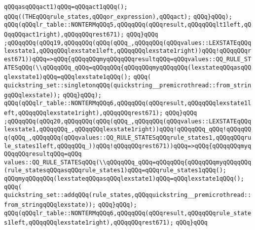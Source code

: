 \verb|qQQqasqQQqact1)qQQq=qQQqact1qQQq();|\newline
\verb|qQQq((THEqQQqrule_states,qQQqor_expression),qQQqact);|\newline
\verb|qQQq}qQQq);|\newline
\verb|qQQq(qQQqlr_table::NONTERMqQQq5,qQQqqQQq(qQQqresult,qQQqqQQqlt1left,qQQqqQQqact1right),qQQqqQQqrest671);|\newline
\verb|qQQq}qQQq|\newline
\verb|;qQQqqQQq(qQQq19,qQQqqQQq(qQQq(qQQq_,qQQqqQQq(qQQqvalues::LEXSTATEqQQqlexstate1,qQQqqQQqlexstate1left,qQQqqQQqlexstate1right))qQQq!qQQqqQQqrest671))qQQq=>qQQq{qQQqqQQqmyqQQqqQQqresultqQQq=qQQqvalues::QQ_RULE_STATESqQQq(\\qQQqqQQq_qQQq=qQQqqQQq{qQQqqQQqmyqQQqqQQq(lexstateqQQqasqQQqlexstate1)qQQq=qQQqlexstate1qQQq();|\newline
\verb|qQQq(|\newline
\verb|quickstring_set::singletonqQQq(quickstring__premicrothread::from_stringqQQqlexstate));|\newline
\verb|qQQq}qQQq);|\newline
\verb|qQQq(qQQqlr_table::NONTERMqQQq6,qQQqqQQq(qQQqresult,qQQqqQQqlexstate1left,qQQqqQQqlexstate1right),qQQqqQQqrest671);|\newline
\verb|qQQq}qQQq|\newline
\verb|;qQQqqQQq(qQQq20,qQQqqQQq(qQQq(qQQq_,qQQqqQQq(qQQqvalues::LEXSTATEqQQqlexstate1,qQQqqQQq_,qQQqqQQqlexstate1right))qQQq!qQQqqQQq_qQQq!qQQqqQQq(qQQq_,qQQqqQQq(qQQqvalues::QQ_RULE_STATESqQQqrule_states1,qQQqqQQqrule_states1left,qQQqqQQq_))qQQq!qQQqqQQqrest671))qQQq=>qQQq{qQQqqQQqmyqQQqqQQqresultqQQq=qQQq|\newline
\verb|values::QQ_RULE_STATESqQQq(\\qQQqqQQq_qQQq=qQQqqQQq{qQQqqQQqmyqQQqqQQq(rule_statesqQQqasqQQqrule_states1)qQQq=qQQqrule_states1qQQq();|\newline
\verb|qQQqmyqQQqqQQq(lexstateqQQqasqQQqlexstate1)qQQq=qQQqlexstate1qQQq();|\newline
\verb|qQQq(|\newline
\verb|quickstring_set::addqQQq(rule_states,qQQqquickstring__premicrothread::from_stringqQQqlexstate));|\newline
\verb|qQQq}qQQq);|\newline
\verb|qQQq(qQQqlr_table::NONTERMqQQq6,qQQqqQQq(qQQqresult,qQQqqQQqrule_states1left,qQQqqQQqlexstate1right),qQQqqQQqrest671);|\newline
\verb|qQQq}qQQq|\newline
